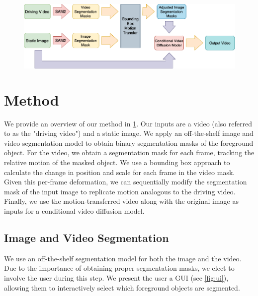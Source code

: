 
\begin{figure}[t]
    \centering
    \includegraphics[width=1\linewidth]{media/method.png}
    \label{fig:method}
\end{figure}

\section{Method}

We provide an overview of our method in \cref{fig:method}. Our inputs are a video (also referred to as the "driving video") and a static image.
We apply an off-the-shelf image and video segmentation model\cite{ravi2024sam2} to obtain binary segmentation masks of the foreground object.
For the video, we obtain a segmentation mask for each frame, tracking the relative motion of the masked object.
We use a bounding box approach to calculate the change in position and scale for each frame in the video mask.
Given this per-frame deformation, we can sequentially modify the segmentation mask of the input image to replicate motion analogous to the driving video.
Finally, we use the motion-transferred video along with the original image as inputs for a conditional video diffusion model\cite{2023videocomposer}.

\subsection{Image and Video Segmentation}

We use an off-the-shelf segmentation model\cite{ravi2024sam2} for both the image and the video.
Due to the importance of obtaining proper segmentation masks, we elect to involve the user during this step.
We present the user a GUI (see \cref{fig:ui}), allowing them to interactively select which foreground objects are segmented.

